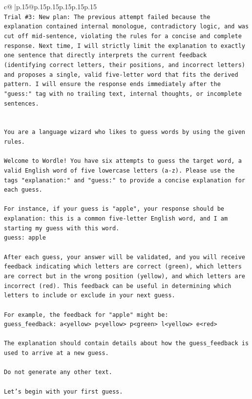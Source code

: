 \documentclass{article}
\begin{document}
{\begin{supertabular}{c@{$\;$}|p{.15\linewidth}@{}p{.15\linewidth}p{.15\linewidth}p{.15\linewidth}p{.15\linewidth}p{.15\linewidth}}
{{{\\ 
\texttt{Trial \#3: New plan: The previous attempt failed because the explanation contained internal monologue, contradictory logic, and was cut off mid{-}sentence, violating the rules for a concise and complete response. Next time, I will strictly limit the explanation to exactly one sentence that directly interprets the current feedback (identifying correct letters, their positions, and incorrect letters) and proposes a single, valid five{-}letter word that fits the derived pattern. I will ensure the response ends immediately after the "guess:" tag with no trailing text, internal thoughts, or incomplete sentences.} \\
\\ 
\\ 
\texttt{You are a language wizard who likes to guess words by using the given rules.} \\
\\ 
\texttt{Welcome to Wordle! You have six attempts to guess the target word, a valid English word of five lowercase letters (a{-}z). Please use the tags "explanation:" and "guess:" to provide a concise explanation for each guess.} \\
\\ 
\texttt{For instance, if your guess is "apple", your response should be} \\
\texttt{explanation: this is a common five{-}letter English word, and I am starting my guess with this word.} \\
\texttt{guess: apple} \\
\\ 
\texttt{After each guess, your answer will be validated, and you will receive feedback indicating which letters are correct (green), which letters are correct but in the wrong position (yellow), and which letters are incorrect (red). This feedback can be useful in determining which letters to include or exclude in your next guess.} \\
\\ 
\texttt{For example, the feedback for "apple" might be:} \\
\texttt{guess\_feedback: a<yellow> p<yellow> p<green> l<yellow> e<red>} \\
\\ 
\texttt{The explanation should contain details about how the guess\_feedback is used to arrive at a new guess.} \\
\\ 
\texttt{Do not generate any other text.} \\
\\ 
\texttt{Let's begin with your first guess.} \\
            }
        }
    }
     \\ \\


\end{supertabular}}
\end{document}
